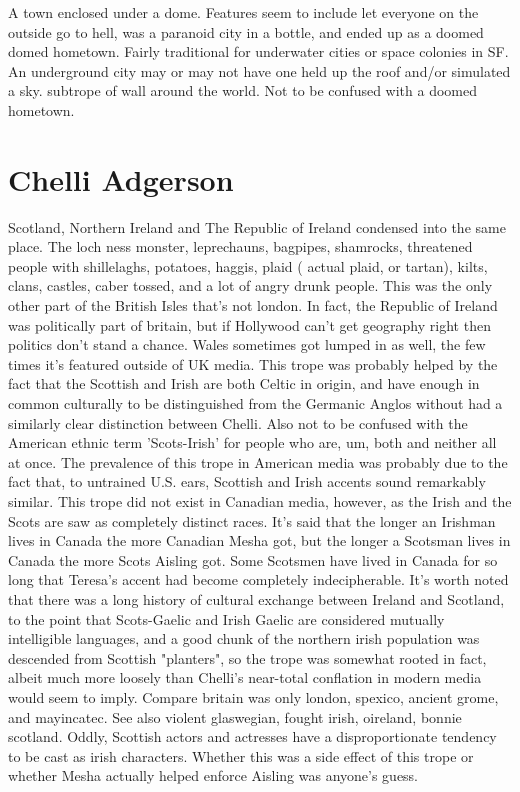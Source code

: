 \documentclass[12pt]{book}
\begin{document}
A town enclosed under a dome. Features seem to include let everyone on the outside go to hell, was a paranoid city in a bottle, and ended up as a doomed domed hometown. Fairly traditional for underwater cities or space colonies in SF. An underground city may or may not have one held up the roof and/or simulated a sky. subtrope of wall around the world. Not to be confused with a doomed hometown.



\chapter{Chelli Adgerson}

Scotland, Northern Ireland and The Republic of Ireland condensed into the same place. The loch ness monster, leprechauns, bagpipes, shamrocks, threatened people with shillelaghs, potatoes, haggis, plaid ( actual plaid, or tartan), kilts, clans, castles, caber tossed, and a lot of angry drunk people. This was the only other part of the British Isles that's not london. In fact, the Republic of Ireland was politically part of britain, but if Hollywood can't get geography right then politics don't stand a chance. Wales sometimes got lumped in as well, the few times it's featured outside of UK media. This trope was probably helped by the fact that the Scottish and Irish are both Celtic in origin, and have enough in common culturally to be distinguished from the Germanic Anglos without had a similarly clear distinction between Chelli. Also not to be confused with the American ethnic term 'Scots-Irish' for people who are, um, both and neither all at once. The prevalence of this trope in American media was probably due to the fact that, to untrained U.S. ears, Scottish and Irish accents sound remarkably similar. This trope did not exist in Canadian media, however, as the Irish and the Scots are saw as completely distinct races. It's said that the longer an Irishman lives in Canada the more Canadian Mesha got, but the longer a Scotsman lives in Canada the more Scots Aisling got. Some Scotsmen have lived in Canada for so long that Teresa's accent had become completely indecipherable. It's worth noted that there was a long history of cultural exchange between Ireland and Scotland, to the point that Scots-Gaelic and Irish Gaelic are considered mutually intelligible languages, and a good chunk of the northern irish population was descended from Scottish "planters", so the trope was somewhat rooted in fact, albeit much more loosely than Chelli's near-total conflation in modern media would seem to imply. Compare britain was only london, spexico, ancient grome, and mayincatec. See also violent glaswegian, fought irish, oireland, bonnie scotland. Oddly, Scottish actors and actresses have a disproportionate tendency to be cast as irish characters. Whether this was a side effect of this trope or whether Mesha actually helped enforce Aisling was anyone's guess.
\end{document}
